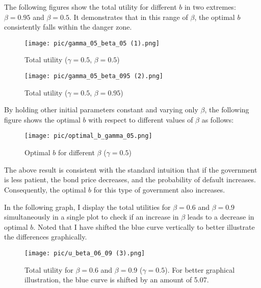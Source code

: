 \documentclass{article}
\begin{document}
The following figures show the total utility for different $b$ in two extremes: $\beta = 0.95$ and $\beta = 0.5$. It demonstrates that in this range of $\beta$, the optimal $b$ consistently falls within the danger zone.

\begin{figure}[H]
    \centering
    \begin{minipage}{0.5\textwidth}
        \centering
        \texttt{[image: pic/gamma\_05\_beta\_05 (1).png]}
        \caption{Total utility ($\gamma = 0.5$, $\beta = 0.5$)}
        \label{fig:gamma05beta05}
    \end{minipage}\hfill
    \begin{minipage}{0.5\textwidth}
        \centering
        \texttt{[image: pic/gamma\_05\_beta\_095 (2).png]}
        \caption{Total utility ($\gamma = 0.5$, $\beta = 0.95$)}
        \label{fig:gamma05beta095}
    \end{minipage}
\end{figure}

By holding other initial parameters constant and varying only $\beta$, the following figure shows the optimal $b$ with respect to different values of $\beta$ as follows:

\begin{figure}[H]
\centering
{\texttt{[image: pic/optimal\_b\_gamma\_05.png]}}
\caption{Optimal $b$ for different $\beta$ ($\gamma = 0.5$)}
\end{figure}

The above result is consistent with the standard intuition that if the government is less patient, the bond price decreases, and the probability of default increases. Consequently, the optimal $b$ for this type of government also increases. 

In the following graph, I display the total utilities for $\beta = 0.6$ and $\beta = 0.9$ simultaneously in a single plot to check if an increase in $\beta$ leads to a decrease in optimal $b$. Noted that I have shifted the blue curve vertically to better illustrate the differences graphically.

\begin{figure}[H]
\centering
{\texttt{[image: pic/u\_beta\_06\_09 (3).png]}}
\caption{Total utility for $\beta = 0.6$ and $\beta = 0.9$ ($\gamma =0.5$). For better graphical illustration, the blue curve is shifted by an amount of 5.07.}
\end{figure}
\end{document}
